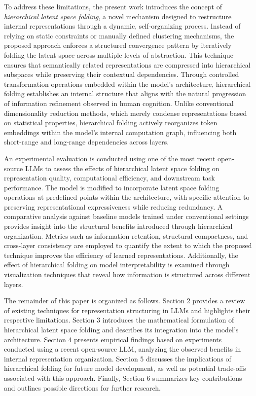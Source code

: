 \documentclass[5p,times]{elsarticle}
\begin{document}
To address these limitations, the present work introduces the concept of \textit{hierarchical latent space folding}, a novel mechanism designed to restructure internal representations through a dynamic, self-organizing process. Instead of relying on static constraints or manually defined clustering mechanisms, the proposed approach enforces a structured convergence pattern by iteratively folding the latent space across multiple levels of abstraction. This technique ensures that semantically related representations are compressed into hierarchical subspaces while preserving their contextual dependencies. Through controlled transformation operations embedded within the model’s architecture, hierarchical folding establishes an internal structure that aligns with the natural progression of information refinement observed in human cognition. Unlike conventional dimensionality reduction methods, which merely condense representations based on statistical properties, hierarchical folding actively reorganizes token embeddings within the model’s internal computation graph, influencing both short-range and long-range dependencies across layers.

An experimental evaluation is conducted using one of the most recent open-source LLMs to assess the effects of hierarchical latent space folding on representation quality, computational efficiency, and downstream task performance. The model is modified to incorporate latent space folding operations at predefined points within the architecture, with specific attention to preserving representational expressiveness while reducing redundancy. A comparative analysis against baseline models trained under conventional settings provides insight into the structural benefits introduced through hierarchical organization. Metrics such as information retention, structural compactness, and cross-layer consistency are employed to quantify the extent to which the proposed technique improves the efficiency of learned representations. Additionally, the effect of hierarchical folding on model interpretability is examined through visualization techniques that reveal how information is structured across different layers.

The remainder of this paper is organized as follows. Section 2 provides a review of existing techniques for representation structuring in LLMs and highlights their respective limitations. Section 3 introduces the mathematical formulation of hierarchical latent space folding and describes its integration into the model’s architecture. Section 4 presents empirical findings based on experiments conducted using a recent open-source LLM, analyzing the observed benefits in internal representation organization. Section 5 discusses the implications of hierarchical folding for future model development, as well as potential trade-offs associated with this approach. Finally, Section 6 summarizes key contributions and outlines possible directions for further research.
\end{document}

